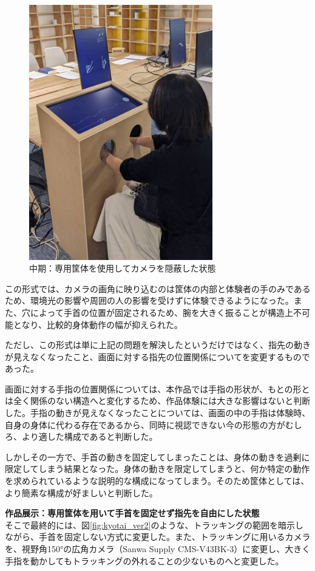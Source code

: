 \begin{figure}[H]
  \centering
  \includegraphics[width=8cm]{img/kyotai_ver1.jpg}
  \caption{中期：専用筐体を使用してカメラを隠蔽した状態}
  \label{fig:kyotai_ver1}
\end{figure}

この形式では、カメラの画角に映り込むのは筐体の内部と体験者の手のみであるため、環境光の影響や周囲の人の影響を受けずに体験できるようになった。また、穴によって手首の位置が固定されるため、腕を大きく振ることが構造上不可能となり、比較的身体動作の幅が抑えられた。

ただし、この形式は単に上記の問題を解決したというだけではなく、指先の動きが見えなくなったこと、画面に対する指先の位置関係についてを変更するものであった。

画面に対する手指の位置関係については、本作品では手指の形状が、もとの形とは全く関係のない構造へと変化するため、作品体験には大きな影響はないと判断した。手指の動きが見えなくなったことについては、画面の中の手指は体験時、自身の身体に代わる存在であるから、同時に視認できない今の形態の方がむしろ、より適した構成であると判断した。

しかしその一方で、手首の動きを固定してしまったことは、身体の動きを過剰に限定してしまう結果となった。身体の動きを限定してしまうと、何か特定の動作を求められているような説明的な構成になってしまう。そのため筐体としては、より簡素な構成が好ましいと判断した。


\textbf{作品展示：専用筐体を用いて手首を固定せず指先を自由にした状態}\\
そこで最終的には、図\ref{fig:kyotai_ver2}のような、トラッキングの範囲を暗示しながら、手首を固定しない方式に変更した。また、トラッキングに用いるカメラを、視野角150°の広角カメラ（Sanwa Supply CMS-V43BK-3）に変更し、大きく手指を動かしてもトラッキングの外れることの少ないものへと変更した。

